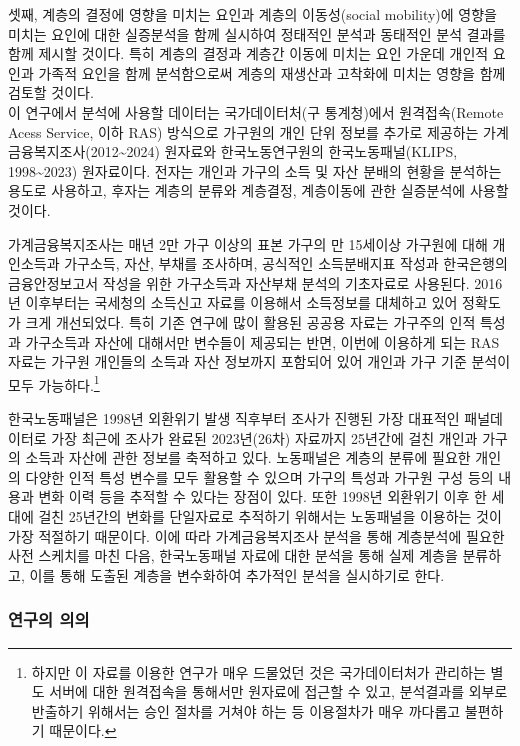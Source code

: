 \documentclass[
  letterpaper,
  DIV=11,
  numbers=noendperiod]{scrartcl}
\begin{document}
셋째, 계층의 결정에 영향을 미치는 요인과 계층의 이동성(social
mobility)에 영향을 미치는 요인에 대한 실증분석을 함께 실시하여 정태적인
분석과 동태적인 분석 결과를 함께 제시할 것이다. 특히 계층의 결정과
계층간 이동에 미치는 요인 가운데 개인적 요인과 가족적 요인을 함께
분석함으로써 계층의 재생산과 고착화에 미치는 영향을 함께 검토할
것이다.\\

이 연구에서 분석에 사용할 데이터는 국가데이터처(구 통계청)에서
원격접속(Remote Acess Service, 이하 RAS) 방식으로 가구원의 개인 단위
정보를 추가로 제공하는 가계금융복지조사(2012\textasciitilde2024)
원자료와 한국노동연구원의 한국노동패널(KLIPS, 1998\textasciitilde2023)
원자료이다. 전자는 개인과 가구의 소득 및 자산 분배의 현황을 분석하는
용도로 사용하고, 후자는 계층의 분류와 계층결정, 계층이동에 관한
실증분석에 사용할 것이다.

가계금융복지조사는 매년 2만 가구 이상의 표본 가구의 만 15세이상 가구원에
대해 개인소득과 가구소득, 자산, 부채를 조사하며, 공식적인 소득분배지표
작성과 한국은행의 금융안정보고서 작성을 위한 가구소득과 자산부채 분석의
기초자료로 사용된다. 2016년 이후부터는 국세청의 소득신고 자료를 이용해서
소득정보를 대체하고 있어 정확도가 크게 개선되었다. 특히 기존 연구에 많이
활용된 공공용 자료는 가구주의 인적 특성과 가구소득과 자산에 대해서만
변수들이 제공되는 반면, 이번에 이용하게 되는 RAS 자료는 가구원 개인들의
소득과 자산 정보까지 포함되어 있어 개인과 가구 기준 분석이 모두
가능하다.\footnote{하지만 이 자료를 이용한 연구가 매우 드물었던 것은
  국가데이터처가 관리하는 별도 서버에 대한 원격접속을 통해서만 원자료에
  접근할 수 있고, 분석결과를 외부로 반출하기 위해서는 승인 절차를 거쳐야
  하는 등 이용절차가 매우 까다롭고 불편하기 때문이다.}

한국노동패널은 1998년 외환위기 발생 직후부터 조사가 진행된 가장 대표적인
패널데이터로 가장 최근에 조사가 완료된 2023년(26차) 자료까지 25년간에
걸친 개인과 가구의 소득과 자산에 관한 정보를 축적하고 있다. 노동패널은
계층의 분류에 필요한 개인의 다양한 인적 특성 변수를 모두 활용할 수
있으며 가구의 특성과 가구원 구성 등의 내용과 변화 이력 등을 추적할 수
있다는 장점이 있다. 또한 1998년 외환위기 이후 한 세대에 걸친 25년간의
변화를 단일자료로 추적하기 위해서는 노동패널을 이용하는 것이 가장
적절하기 때문이다. 이에 따라 가계금융복지조사 분석을 통해 계층분석에
필요한 사전 스케치를 마친 다음, 한국노동패널 자료에 대한 분석을 통해
실제 계층을 분류하고, 이를 통해 도출된 계층을 변수화하여 추가적인 분석을
실시하기로 한다.

\subsubsection{연구의 의의}\label{uxc5f0uxad6cuxc758-uxc758uxc758}
\end{document}
